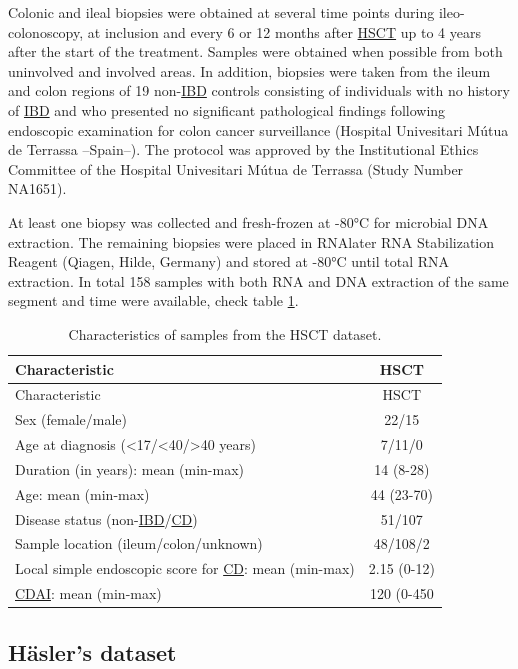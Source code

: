 \documentclass[
  12pt,
  a4paper,
  twoside,
  openright]{book}
\begin{document}
Colonic and ileal biopsies were obtained at several time points during ileo-colonoscopy, at inclusion and every 6 or 12 months after \protect\hyperlink{acronyms_HSCT}{HSCT} up to 4 years after the start of the treatment.
Samples were obtained when possible from both uninvolved and involved areas.
In addition, biopsies were taken from the ileum and colon regions of 19 non-\protect\hyperlink{acronyms_IBD}{IBD} controls consisting of individuals with no history of \protect\hyperlink{acronyms_IBD}{IBD} and who presented no significant pathological findings following endoscopic examination for colon cancer surveillance (Hospital Univesitari Mútua de Terrassa --Spain--).
The protocol was approved by the Institutional Ethics Committee of the Hospital Univesitari Mútua de Terrassa (Study Number NA1651).

At least one biopsy was collected and fresh-frozen at -80°C for microbial DNA extraction.
The remaining biopsies were placed in RNAlater RNA Stabilization Reagent (Qiagen, Hilde, Germany) and stored at -80°C until total RNA extraction.
In total 158 samples with both RNA and DNA extraction of the same segment and time were available, check table \ref{tab:HSCT}.

\begin{longtable}[]{@{}lc@{}}
\caption{\label{tab:HSCT} Characteristics of samples from the HSCT dataset.}\tabularnewline
\toprule
Characteristic & HSCT \\
\midrule
\endfirsthead
\toprule
Characteristic & HSCT \\
\midrule
\endhead
Sex (female/male) & 22/15 \\
Age at diagnosis (\textless17/\textless40/\textgreater40 years) & 7/11/0 \\
Duration (in years): mean (min-max) & 14 (8-28) \\
Age: mean (min-max) & 44 (23-70) \\
Disease status (non-\protect\hyperlink{acronyms_IBD}{IBD}/\protect\hyperlink{acronyms_CD}{CD}) & 51/107 \\
Sample location (ileum/colon/unknown) & 48/108/2 \\
Local simple endoscopic score for \protect\hyperlink{acronyms_CD}{CD}: mean (min-max) & 2.15 (0-12) \\
\protect\hyperlink{acronyms_CDAI}{CDAI}: mean (min-max) & 120 (0-450 \\
\bottomrule
\end{longtable}

\hypertarget{methods-hasler}{%
\subsection{Häsler's dataset}\label{methods-hasler}}
\end{document}

